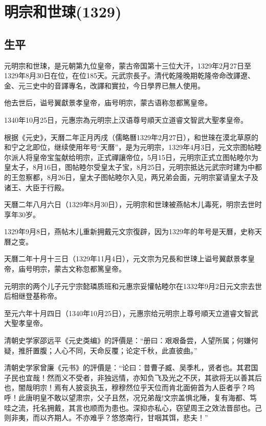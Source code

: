 
\section{明宗和世㻋\tiny(1329)}

\subsection{生平}

元明宗和世㻋，是元朝第九位皇帝，蒙古帝国第十三位大汗，1329年2月27日至1329年8月30日在位，在位185天。元武宗長子。清代乾隆晚期乾隆帝命改譯遼、金、元三史中的音譯專名，改譯和實拉，今日學界已無人使用。

他去世后，谥号翼獻景孝皇帝，庙号明宗，蒙古语称忽都篤皇帝。

1340年10月25日，元惠宗為元明宗上汉语尊号順天立道睿文智武大聖孝皇帝。

根据《元史》，天曆二年正月丙戌（儒略曆1329年2月27日），和世琜在漠北草原的和宁之北即位，继续使用年号“天曆”，是为元明宗，1329年4月3日，元文宗图帖睦尔派人将皇帝宝玺献给明宗，正式禪讓帝位，5月15日，元明宗正式立图帖睦尔为皇太子，8月16日，图帖睦尔受皇太子宝，8月25日，元明宗抵达元武宗时建为中都的王忽察都，8月26日，皇太子图帖睦尔入见，两兄弟会面，元明宗宴请皇太子及诸王、大臣于行殿。

天曆二年八月六日（1329年8月30日），元明宗和世㻋被燕帖木儿毒死，明宗去世时享年30岁。

1329年9月8日，燕帖木儿重新拥戴元文宗復辟，因为1329年的年号是天曆，史称天曆之变。

天曆二年十月十三日（1329年11月4日），元文宗为兄長和世㻋上谥号翼獻景孝皇帝，庙号明宗，蒙古文称忽都篤皇帝。

元明宗的两个儿子元宁宗懿璘质班和元惠宗妥懽帖睦尔在1332年9月2日元文宗去世后相继登基称帝。

至元六年十月四日（1340年10月25日），元惠宗给元明宗上尊号順天立道睿文智武大聖孝皇帝。

清朝史学家邵远平《元史类编》的評價是：“册曰：艰艰备尝，人望所属；何嫌何疑，推肝置腹；人心不同，天命反覆；论定千秋，此直彼曲。”

清朝史学家曾廉《元书》的評價是：“论曰：昔曹子臧、吴季札，贤者也。其君国子民也宜哉！然而义不受者，非独远情，亦知负飞及光之不厌，其欲将无以善其后也，闇哉明宗！焉有人披衮执玉，穆穆然位乎天位而肯北面俯首为人臣者乎？呜呼！此唐明皇不敢以望肃宗，父子且然，况兄弟哉!文宗盖惧北陲，复有海都、笃哇之流，托名拥戴，其言也顺而为患也。深抑亦私心，窃望周王之效法晋邸也。己则非夷，而以齐期人。不亦难乎？悠悠南行，甘咽其饵，悲夫！”


